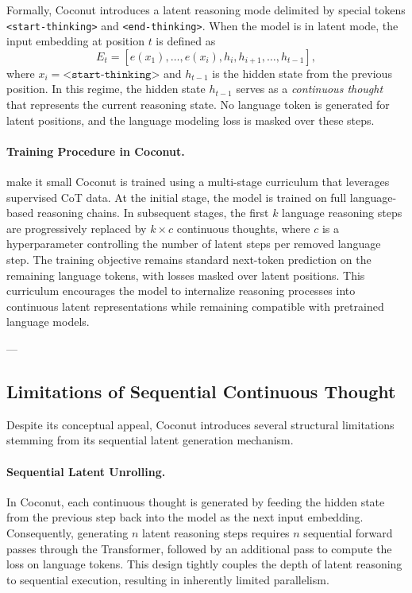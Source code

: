 Formally, Coconut introduces a latent reasoning mode delimited by special tokens \texttt{<start-thinking>} and \texttt{<end-thinking>}. When the model is in latent mode, the input embedding at position $t$ is defined as
\[
E_t = [e(x_1), \dots, e(x_i), h_i, h_{i+1}, \dots, h_{t-1}],
\]
where $x_i = \texttt{<start-thinking>}$ and $h_{t-1}$ is the hidden state from the previous position. In this regime, the hidden state $h_{t-1}$ serves as a \emph{continuous thought} that represents the current reasoning state. No language token is generated for latent positions, and the language modeling loss is masked over these steps.

\paragraph{Training Procedure in Coconut.}
make it small
Coconut is trained using a multi-stage curriculum that leverages supervised CoT data. At the initial stage, the model is trained on full language-based reasoning chains. In subsequent stages, the first $k$ language reasoning steps are progressively replaced by $k \times c$ continuous thoughts, where $c$ is a hyperparameter controlling the number of latent steps per removed language step. The training objective remains standard next-token prediction on the remaining language tokens, with losses masked over latent positions. This curriculum encourages the model to internalize reasoning processes into continuous latent representations while remaining compatible with pretrained language models.

---

\subsection{Limitations of Sequential Continuous Thought}
\label{sec:limitations}

Despite its conceptual appeal, Coconut introduces several structural limitations stemming from its sequential latent generation mechanism.

\paragraph{Sequential Latent Unrolling.}
In Coconut, each continuous thought is generated by feeding the hidden state from the previous step back into the model as the next input embedding. Consequently, generating $n$ latent reasoning steps requires $n$ sequential forward passes through the Transformer, followed by an additional pass to compute the loss on language tokens. This design tightly couples the depth of latent reasoning to sequential execution, resulting in inherently limited parallelism.

